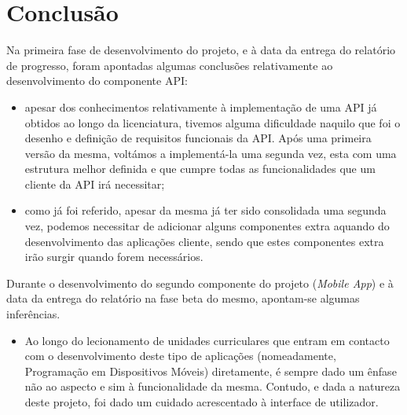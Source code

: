 \section{Conclusão}
Na primeira fase de desenvolvimento do projeto, e à data da entrega do relatório de progresso, foram apontadas algumas conclusões relativamente ao desenvolvimento do componente API:

\begin{itemize}
	\item apesar dos conhecimentos relativamente à implementação de uma API já obtidos ao longo da licenciatura, tivemos alguma dificuldade naquilo que foi o desenho e definição de requisitos funcionais da API. Após uma primeira versão da mesma, voltámos a implementá-la uma segunda vez, esta com uma estrutura melhor definida e que cumpre todas as funcionalidades que um cliente da API irá necessitar;
	\item como já foi referido, apesar da mesma já ter sido consolidada uma segunda vez, podemos necessitar de adicionar alguns componentes extra aquando do desenvolvimento das aplicações cliente, sendo que estes componentes extra irão surgir quando forem necessários.
\end{itemize}

\noindent Durante o desenvolvimento do segundo componente do projeto (\textit{Mobile App}) e à data da entrega do relatório na fase beta do mesmo, apontam-se algumas inferências.

\begin{itemize}
	\item Ao longo do lecionamento de unidades curriculares que entram em contacto com o desenvolvimento deste tipo de aplicações (nomeadamente, Programação em Dispositivos Móveis) diretamente, é sempre dado um ênfase não ao aspecto e sim à funcionalidade da mesma. Contudo, e dada a natureza deste projeto, foi dado um cuidado acrescentado à interface de utilizador.
\end{itemize}
